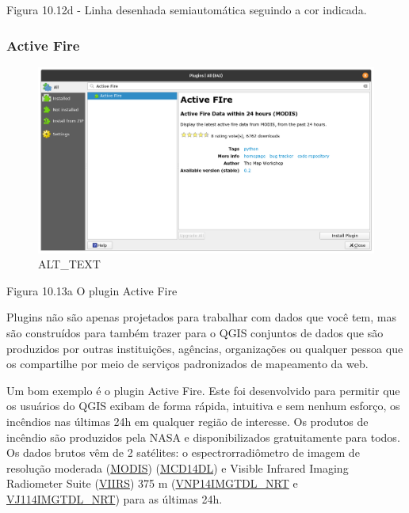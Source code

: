 \documentclass[
]{book}
\begin{document}
Figura 10.12d - Linha desenhada semiautomática seguindo a cor indicada.

\hypertarget{active-fire}{%
\subsubsection{\texorpdfstring{\textbf{Active Fire}}{Active Fire}}\label{active-fire}}

\begin{figure}
\centering
\includegraphics{media/modulo10/fig1013_a.png}
\caption{ALT\_TEXT}
\end{figure}

Figura 10.13a O plugin Active Fire

Plugins não são apenas projetados para trabalhar com dados que você tem, mas são construídos para também trazer para o QGIS conjuntos de dados que são produzidos por outras instituições, agências, organizações ou qualquer pessoa que os compartilhe por meio de serviços padronizados de mapeamento da web.

Um bom exemplo é o plugin Active Fire. Este foi desenvolvido para permitir que os usuários do QGIS exibam de forma rápida, intuitiva e sem nenhum esforço, os incêndios nas últimas 24h em qualquer região de interesse. Os produtos de incêndio são produzidos pela NASA e disponibilizados gratuitamente para todos. Os dados brutos vêm de 2 satélites: o espectrorradiômetro de imagem de resolução moderada (\href{https://modis.gsfc.nasa.gov/}{MODIS}) (\href{https://earthdata.nasa.gov/earth-observation-data/near-real-time/firm/c6-mcd14dl}{MCD14DL}) e Visible Infrared Imaging Radiometer Suite (\href{https://www.jpss.noaa.gov/viirs.html}{VIIRS}) 375 m (\href{https://earthdata.nasa.gov/earth-observation-data/near-real-time/firms/v1-vnp14imgt}{VNP14IMGTDL\_NRT} e \href{https://earthdata.nasa.gov/earth-observation-data/near-real-time/firms/vj114imgtdl-nrt}{VJ114IMGTDL\_NRT}) para as últimas 24h.
\end{document}
